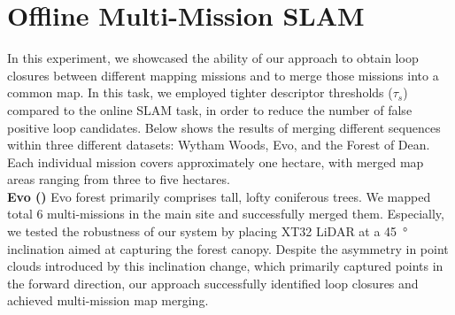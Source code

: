 \section{Offline Multi-Mission SLAM} 
\label{sec:offline_multi_mission}
In this experiment, we showcased the ability of our approach to obtain loop closures between different mapping missions and to merge those missions into a common map. In this task, we employed tighter descriptor thresholds ($\tau_{s}$) compared to the online SLAM task, in order to reduce the number of false positive loop candidates.
Below shows the results of merging different sequences within three different datasets: Wytham Woods, Evo, and the Forest of Dean. Each individual mission covers approximately one hectare, with merged map areas ranging from three to five hectares. \\
\newline
\textbf{Evo ()}\hspace{0.5em}  Evo forest primarily comprises tall, lofty coniferous trees. We mapped total 6 multi-missions in the main site and successfully merged them. Especially, we tested the robustness of our system by placing XT32 LiDAR at a \SI{45}{\degree} inclination aimed at capturing the forest canopy. Despite the asymmetry in point clouds introduced by this inclination change, which primarily captured points in the forward direction, our approach successfully identified loop closures and achieved multi-mission map merging.\\
